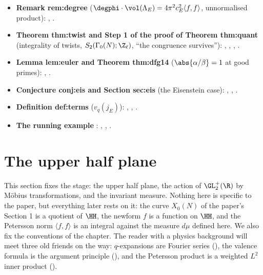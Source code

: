 \begin{itemize}
\item \textbf{Remark rem:degree} ($\degphi\cdot\vol(\Lambda_E)=4\pi^2c_E^2\langle f,f\rangle$, unnormalised product): , .
\item \textbf{Theorem thm:twist and Step 1 of the proof of Theorem thm:quant} (integrality of twists, $S_2(\Gamma_0(N);\Z_\ell)$, ``the congruence survives''): ,
, , .
\item \textbf{Lemma lem:euler and Theorem thm:dfg14} ($\abs{\alpha/\beta}=1$ at good primes): , .
\item \textbf{Conjecture conj:eis and Section sec:eis} (the Eisenstein case): , , .
\item \textbf{Definition def:terms} ($v_q(j_E)$): , , .
\item \textbf{The running example }: , , .
\end{itemize}

\section{The upper half plane}\label{sec:modforms:upper-half-plane}

This section fixes the stage: the upper half plane, the action of $\GL_2^+(\R)$ by M\"obius transformations, and the invariant
measure. Nothing here is specific to the paper, but everything later rests on it: the curve $X_0(N)$ of the paper's Section 1 is a
quotient of $\HH$, the newform $f$ is a function on $\HH$, and the Petersson norm $\langle f,f\rangle$ is an integral against the measure
$d\mu$ defined here. We also fix the conventions of the chapter. The reader with a physics background will meet three old friends
on the way: $q$-expansions are Fourier series (), the valence formula is the argument principle
(), and the Petersson product is a weighted $L^2$ inner product ().

